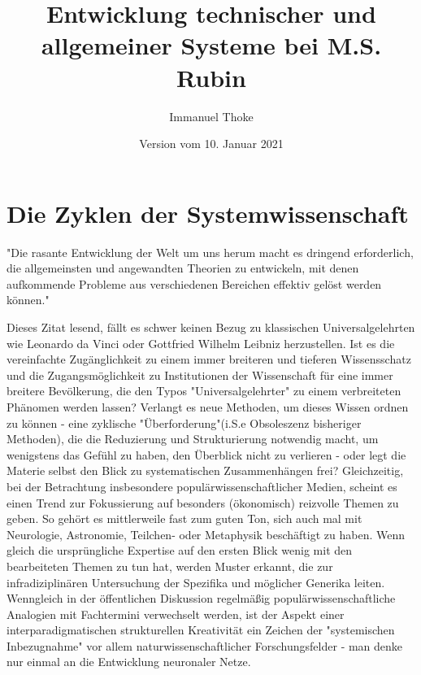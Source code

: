 \documentclass[a4paper,11pt]{article}
\author{Immanuel Thoke}
\title{Entwicklung technischer und allgemeiner Systeme bei M.S. Rubin}
\date{Version vom 10. Januar 2021}
\begin{document}
\maketitle
\tableofcontents
\newpage

\begin{abstract}

\end{abstract}
\section{Die Zyklen der Systemwissenschaft}
"Die rasante Entwicklung der Welt um uns herum macht es dringend erforderlich, die allgemeinsten und angewandten Theorien zu entwickeln,
mit denen aufkommende Probleme aus verschiedenen Bereichen effektiv gelöst werden können."\cite{Rubin2002}

Dieses Zitat lesend, fällt es schwer keinen Bezug zu klassischen Universalgelehrten wie Leonardo da Vinci oder Gottfried Wilhelm Leibniz herzustellen.
Ist es die vereinfachte Zugänglichkeit zu einem immer breiteren und tieferen Wissensschatz und die Zugangsmöglichkeit zu Institutionen der Wissenschaft für eine immer breitere Bevölkerung, die den Typos "Universalgelehrter" zu einem verbreiteten Phänomen werden lassen? Verlangt es neue Methoden, um dieses Wissen ordnen zu können - eine zyklische "Überforderung"(i.S.e Obsoleszenz bisheriger Methoden), die die Reduzierung und Strukturierung notwendig macht, um wenigstens das Gefühl zu haben, den Überblick nicht zu verlieren - oder legt die Materie selbst den Blick zu systematischen Zusammenhängen frei?
Gleichzeitig, bei der Betrachtung insbesondere populärwissenschaftlicher Medien, scheint es einen Trend zur Fokussierung auf besonders (ökonomisch) reizvolle Themen zu geben. So gehört es mittlerweile fast zum guten Ton, sich auch mal mit Neurologie, Astronomie, Teilchen- oder Metaphysik beschäftigt zu haben. Wenn gleich die ursprüngliche Expertise auf den ersten Blick wenig mit den bearbeiteten Themen zu tun hat, werden Muster erkannt, die zur infradiziplinären Untersuchung der Spezifika und möglicher Generika leiten. Wenngleich in der öffentlichen Diskussion regelmäßig populärwissenschaftliche Analogien mit Fachtermini verwechselt werden, ist der Aspekt einer interparadigmatischen strukturellen Kreativität ein Zeichen der "systemischen Inbezugnahme" vor allem naturwissenschaftlicher Forschungsfelder - man denke nur einmal an die Entwicklung neuronaler Netze. 
\end{document}
